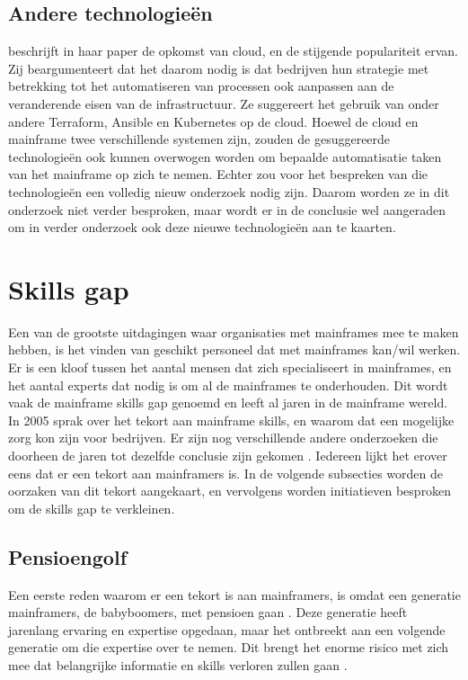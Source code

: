 \subsection{Andere technologieën}
\textcite{Thota2020} beschrijft in haar paper de opkomst van cloud, en de stijgende populariteit ervan. Zij beargumenteert dat het daarom nodig is dat bedrijven hun strategie met betrekking tot het automatiseren van processen ook aanpassen aan de veranderende eisen van de infrastructuur. Ze suggereert het gebruik van onder andere Terraform, Ansible en Kubernetes op de cloud. Hoewel de cloud en mainframe twee verschillende systemen zijn, zouden de gesuggereerde technologieën ook kunnen overwogen worden om bepaalde automatisatie taken van het mainframe op zich te nemen. Echter zou voor het bespreken van die technologieën een volledig nieuw onderzoek nodig zijn. Daarom worden ze in dit onderzoek niet verder besproken, maar wordt er in de conclusie wel aangeraden om in verder onderzoek ook deze nieuwe technologieën aan te kaarten.

\section{Skills gap}
Een van de grootste uitdagingen waar organisaties met mainframes mee te maken hebben, is het vinden van geschikt personeel dat met mainframes kan/wil werken. Er is een kloof tussen het aantal mensen dat zich specialiseert in mainframes, en het aantal experts dat nodig is om al de mainframes te onderhouden. Dit wordt vaak de mainframe skills gap genoemd en leeft al jaren in de mainframe wereld. In 2005 sprak \textcite{Barnett2005} over het tekort aan mainframe skills, en waarom dat een mogelijke zorg kon zijn voor bedrijven. Er zijn nog verschillende andere onderzoeken die doorheen de jaren tot dezelfde conclusie zijn gekomen \autocite{NgoYe2018,Murphy2010,Vanaparthi2025}. Iedereen lijkt het erover eens dat er een tekort aan mainframers is. In de volgende subsecties worden de oorzaken van dit tekort aangekaart, en vervolgens worden initiatieven besproken om de skills gap te verkleinen.

\subsection{Pensioengolf}
Een eerste reden waarom er een tekort is aan mainframers, is omdat een generatie mainframers, de babyboomers, met pensioen gaan \autocite{Phillips2013}. Deze generatie heeft jarenlang ervaring en expertise opgedaan, maar het ontbreekt aan een volgende generatie om die expertise over te nemen. Dit brengt het enorme risico met zich mee dat belangrijke informatie en skills verloren zullen gaan \autocite{Sagers2018}. 

